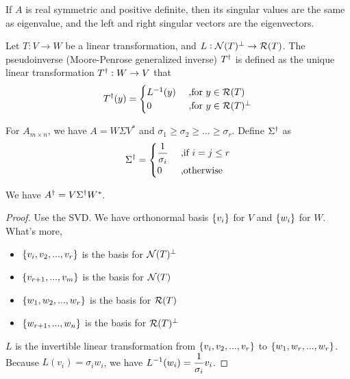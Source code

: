 \begin{theorem}
    If $A$ is real symmetric and positive definite, then its singular values are the same as eigenvalue, and the left and right singular vectors are the eigenvectors.    
\end{theorem}


\begin{definition}[Pseudoinverse]
    Let $T: V \rightarrow W$ be a linear transformation, and $L: \mathcal{N}(T)^\perp \rightarrow \mathcal{R}(T)$. The pseudoinverse (Moore-Penrose generalized inverse) ${T}^\dagger$ is defined as the unique linear transformation ${T}^\dagger: W \rightarrow V$ that
    \begin{equation}
        {T}^\dagger(y) = \begin{aligned}
            \begin{cases}
                {L}^{-1}(y) & \text{ ,for } y \in \mathcal{R}(T) \\
                0 & \text{ ,for } y \in \mathcal{R}(T)^\perp
            \end{cases}
        \end{aligned}
    \end{equation}
    
    
    For $A_{m \times n}$, we have $A = W \Sigma V^*$ and $\sigma_1 \geq \sigma_2 \geq ... \geq \sigma_r$. Define ${\Sigma}^\dagger$ as 
    \begin{equation}
        {\Sigma}^\dagger = \begin{aligned}
            \begin{cases}
                \displaystyle \frac{1}{\sigma_i} & \text{ ,if } i = j \leq r \\
                0 & \text{ ,otherwise}
            \end{cases}
        \end{aligned}
    \end{equation}
    
    We have ${A}^\dagger = V {\Sigma}^\dagger W^*$.
\end{definition}
\begin{proof}
    Use the SVD. We have orthonormal basis $\set{v_i}$ for $V$ and $\set{w_i}$ for $W$. What's more,
    \begin{itemize}
        \item $\set{v_i, v_2, ..., v_r}$ is the basis for $\mathcal{N}(T)^\perp$
        \item $\set{v_{r+1}, ..., v_m}$ is the basis for $\mathcal{N}(T)$
        \item $\set{w_1, w_2, ..., w_r}$ is the basis for $\mathcal{R}(T)$
        \item $\set{w_{r+1}, ..., w_n}$ is the basis for $\mathcal{R}(T)^\perp$
    \end{itemize}
    
    $L$ is the invertible linear transformation from $\set{v_i, v_2, ..., v_r}$ to $\set{w_1, w_r, ..., w_r}$. Because $L(v_i) = \sigma_i w_i$, we have $\displaystyle {L}^{-1}(w_i) = \frac{1}{\sigma_i} v_i$.
\end{proof}

